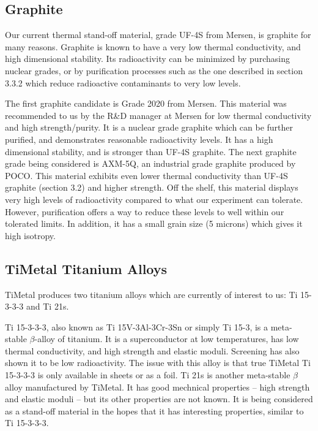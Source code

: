 \documentclass{report}
\begin{document}
\subsection{Graphite}

Our current thermal stand-off material, grade UF-4S from Mersen, is graphite for many reasons. Graphite is known to have a very low thermal conductivity, and high dimensional stability. Its radioactivity can be minimized by purchasing nuclear grades, or by purification processes such as the one described in section 3.3.2 which reduce radioactive contaminants to very low levels.

The first graphite candidate is Grade 2020 from Mersen. This material was recommended to us by the R\&D manager at Mersen for low thermal conductivity and high strength/purity. It is a nuclear grade graphite which can be further purified, and demonstrates reasonable radioactivity levels. It has a high dimensional stability, and is stronger than UF-4S graphite.
The next graphite grade being considered is AXM-5Q\footnotemark, an industrial grade graphite produced by POCO. This material exhibits even lower thermal conductivity than UF-4S graphite (section 3.2) and higher strength. Off the shelf, this material displays very high levels of radioactivity compared to what our experiment can tolerate. However, purification offers a way to reduce these levels to well within our tolerated limits. In addition, it has a small grain size (5 microns) which gives it high isotropy.


\subsection{TiMetal Titanium Alloys}

TiMetal produces two titanium alloys which are currently of interest to us: Ti 15-3-3-3 and Ti 21s.

Ti 15-3-3-3, also known as Ti 15V-3Al-3Cr-3Sn or simply Ti 15-3, is a meta-stable $\beta$-alloy of titanium. It is a superconductor at low temperatures, has low thermal conductivity, and high strength and elastic moduli. Screening has also shown it to be low radioactivity. The issue with this alloy is that true TiMetal Ti 15-3-3-3 is only available in sheets or as a foil. Ti 21s is another meta-stable $\beta$ alloy manufactured by TiMetal. It has good mechnical properties -- high strength and elastic moduli -- but its other properties are not known. It is being considered as a stand-off material in the hopes that it has interesting properties, similar to Ti 15-3-3-3.
\end{document}
